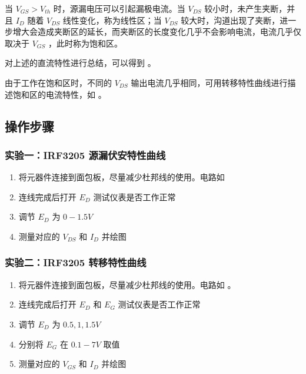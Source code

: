 \documentclass[lang=cn,11pt,a4paper,cite=authoryear]{elegantpaper}
\begin{document}
当 \(V_{GS} > V_{th}\) 时，源漏电压可以引起漏极电流。当 \(V_{DS}\) 较小时，未产生夹断，并且 \(I_D\) 随着 \(V_{DS}\) 线性变化，称为线性区；当 \(V_{DS}\) 较大时，沟道出现了夹断，进一步增大会造成夹断区的延长，而夹断区的长度变化几乎不会影响电流，电流几乎仅取决于 \(V_{GS}\) ，此时称为饱和区。

对上述的直流特性进行总结，可以得到  。


由于工作在饱和区时，不同的 \(V_{DS}\) 输出电流几乎相同，可用转移特性曲线进行描述饱和区的电流特性，如  。


\subsection{操作步骤}

\subsubsection{实验一：IRF3205 源漏伏安特性曲线}

\begin{enumerate}
    \item 将元器件连接到面包板，尽量减少杜邦线的使用。电路如  
    \item 连线完成后打开 \(E_D\) 测试仪表是否工作正常
    \item 调节 \(E_D\) 为 \(0-1.5 V\) 
    \item 测量对应的 \(V_{DS}\) 和  \(I_D\) 并绘图
\end{enumerate}


\subsubsection{实验二：IRF3205 转移特性曲线}


\begin{enumerate}
    \item 将元器件连接到面包板，尽量减少杜邦线的使用。电路如  。
    \item 连线完成后打开 \(E_D\) 和 \(E_G\) 测试仪表是否工作正常
    \item 调节 \(E_D\) 为 \(0.5, 1, 1.5 V\) 
    \item 分别将 \(E_G\) 在 \(0.1 - 7 V\) 取值
    \item 测量对应的 \(V_{GS}\) 和  \(I_D\) 并绘图
\end{enumerate}
\end{document}
